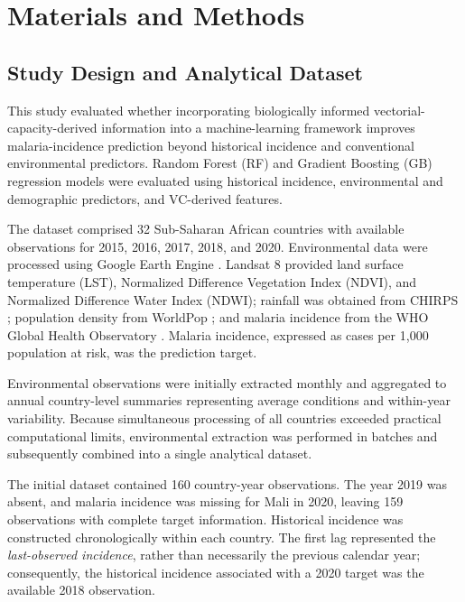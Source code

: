 \documentclass[10pt,twocolumn]{article}
\begin{document}

\section{Materials and Methods}

\subsection{Study Design and Analytical Dataset}

This study evaluated whether incorporating biologically informed
vectorial-capacity-derived information into a machine-learning
framework improves malaria-incidence prediction beyond historical
incidence and conventional environmental predictors. Random Forest
(RF) and Gradient Boosting (GB) regression models were evaluated using
historical incidence, environmental and demographic predictors, and
VC-derived features.

The dataset comprised 32 Sub-Saharan African countries with available
observations for 2015, 2016, 2017, 2018, and 2020. Environmental data
were processed using Google Earth Engine \parencite{Gorelick2017}.
Landsat 8 provided land surface temperature (LST), Normalized
Difference Vegetation Index (NDVI), and Normalized Difference Water
Index (NDWI); rainfall was obtained from CHIRPS
\parencite{Funk2015}; population density from WorldPop
\parencite{Tatem2017}; and malaria incidence from the WHO Global
Health Observatory \parencite{WHO_GHO_Malaria}. Malaria incidence,
expressed as cases per 1,000 population at risk, was the prediction
target.

Environmental observations were initially extracted monthly and
aggregated to annual country-level summaries representing average
conditions and within-year variability. Because simultaneous
processing of all countries exceeded practical computational limits,
environmental extraction was performed in batches and subsequently
combined into a single analytical dataset.

The initial dataset contained 160 country-year observations. The year
2019 was absent, and malaria incidence was missing for Mali in 2020,
leaving 159 observations with complete target information. Historical
incidence was constructed chronologically within each country. The
first lag represented the \emph{last-observed incidence}, rather than
necessarily the previous calendar year; consequently, the historical
incidence associated with a 2020 target was the available 2018
observation.
\end{document}
